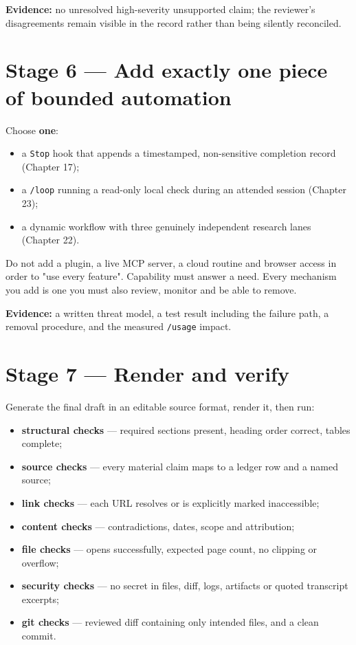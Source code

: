 \documentclass[11pt,a4paper,twoside,openany]{book}
\begin{document}
\textbf{Evidence:} no unresolved high-severity unsupported claim; the reviewer's disagreements remain visible in the record rather than being silently reconciled.


\FloatBarrier
\setcounter{section}{6}
\section{Stage 6 — Add exactly one piece of bounded automation}

Choose \textbf{one}:


\begin{itemize}
\item a \texttt{Stop} hook that appends a timestamped, non-sensitive completion record (Chapter 17);
\item a \texttt{/\allowbreak{}loop} running a read-only local check during an attended session (Chapter 23);
\item a dynamic workflow with three genuinely independent research lanes (Chapter 22).
\end{itemize}

Do not add a plugin, a live MCP server, a cloud routine and browser access in order to "use every feature". Capability must answer a need. Every mechanism you add is one you must also review, monitor and be able to remove.


\textbf{Evidence:} a written threat model, a test result including the failure path, a removal procedure, and the measured \texttt{/\allowbreak{}usage} impact.


\FloatBarrier
\setcounter{section}{7}
\section{Stage 7 — Render and verify}

Generate the final draft in an editable source format, render it, then run:


\begin{itemize}
\item \textbf{structural checks} — required sections present, heading order correct, tables complete;
\item \textbf{source checks} — every material claim maps to a ledger row and a named source;
\item \textbf{link checks} — each URL resolves or is explicitly marked inaccessible;
\item \textbf{content checks} — contradictions, dates, scope and attribution;
\item \textbf{file checks} — opens successfully, expected page count, no clipping or overflow;
\item \textbf{security checks} — no secret in files, diff, logs, artifacts or quoted transcript excerpts;
\item \textbf{git checks} — reviewed diff containing only intended files, and a clean commit.
\end{itemize}
\end{document}
